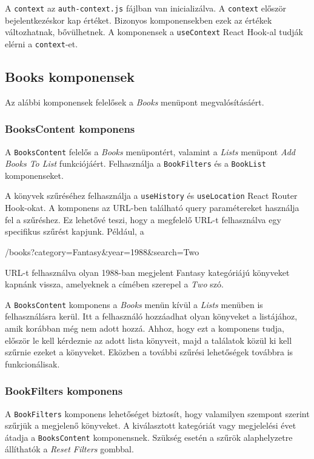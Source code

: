 A \texttt{context} az \texttt{auth-context.js} fájlban van inicializálva. A \texttt{context} először bejelentkezéskor kap értéket. Bizonyos komponensekben ezek az értékek változhatnak, bővülhetnek. A komponensek a \texttt{useContext} React Hook-al tudják elérni a \texttt{context}-et.

\subsection{Books komponensek}

Az alábbi komponensek felelősek a \textit{Books} menüpont megvalósításáért.

\subsubsection{BooksContent komponens}

A \texttt{BooksContent} felelős a \textit{Books} menüpontért, valamint a \textit{Lists} menüpont \textit{Add Books To List} funkciójáért. Felhasználja a \texttt{BookFilters} és a \texttt{BookList} komponenseket.

A könyvek szűréséhez felhasználja a \texttt{useHistory} és \texttt{useLocation} React Router Hook-okat. A komponens az URL-ben található query paramétereket használja fel a szűréshez. Ez lehetővé teszi, hogy a megfelelő URL-t felhasználva egy specifikus szűrést kapjunk. Például, a
\begin{java}
/books?category=Fantasy\&year=1988\&search=Two
\end{java}
URL-t felhasználva olyan 1988-ban megjelent Fantasy kategóriájú könyveket kapnánk vissza, amelyeknek a címében szerepel a \textit{Two} szó.

A \texttt{BooksContent} komponens a \textit{Books} menün kívül a \textit{Lists} menüben is felhasználásra kerül. Itt a felhasználó hozzáadhat olyan könyveket a listájához, amik korábban még nem adott hozzá. Ahhoz, hogy ezt a komponens tudja, először le kell kérdeznie az adott lista könyveit, majd a találatok közül ki kell szűrnie ezeket a könyveket. Eközben a további szűrési lehetőségek továbbra is funkcionálisak.

\subsubsection{BookFilters komponens}

A \texttt{BookFilters} komponens lehetőséget biztosít, hogy valamilyen szempont szerint szűrjük a megjelenő könyveket. A kiválasztott kategóriát vagy megjelelési évet átadja a \texttt{BooksContent} komponensnek. Szükség esetén a szűrök alaphelyzetre állíthatók a \textit{Reset Filters} gombbal.

